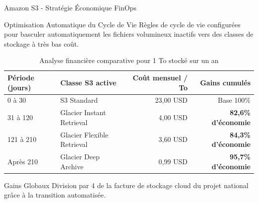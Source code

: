 \documentclass{beamer}
\begin{document}
\begin{frame}{Amazon S3 - Stratégie Économique FinOps}
    \begin{block}{\small Optimisation Automatique du Cycle de Vie}
        \scriptsize
        Règles de cycle de vie configurées pour basculer automatiquement les fichiers volumineux inactifs vers des classes de stockage à très bas coût.
    \end{block}
    \begin{table}
        \centering
        \caption{\tiny Analyse financière comparative pour 1 To stocké sur un an}
        \begin{tabular}{llrr}
            \toprule
            \textbf{Période (jours)} & \textbf{Classe S3 active} & \textbf{Coût mensuel / To} & \textbf{Gains cumulés} \\
            \midrule
            0 à 30 & S3 Standard & 23,00 USD & Base 100\% \\
            31 à 120 & Glacier Instant Retrieval & 4,00 USD & \textbf{82,6\% d'économie} \\
            121 à 210 & Glacier Flexible Retrieval & 3,60 USD & \textbf{84,3\% d'économie} \\
            Après 210 & Glacier Deep Archive & 0,99 USD & \textbf{95,7\% d'économie} \\
            \bottomrule
        \end{tabular}
    \end{table}
    \begin{exampleblock}{\small Gains Globaux}
        \scriptsize
        Division par 4 de la facture de stockage cloud du projet national grâce à la transition automatisée.
    \end{exampleblock}
\end{frame}
\end{document}
